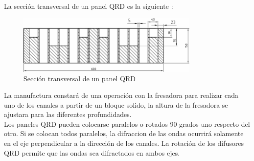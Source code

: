 La sección transversal de un panel QRD es la siguiente \cite{PilchDiffusers}:
\begin{figure}[!htb]
    \centering
    \includegraphics[width=0.8\textwidth]{imagenes/QRD-150-diffusers-cross-section.png}
    \caption{Sección transversal de un panel QRD}
    \label{fig:QRDCross}
\end{figure}
\FloatBarrier
La manufactura constará de una operación con la fresadora para realizar cada uno de los canales a partir de un bloque solido, la altura de la fresadora se ajustara para las diferentes profundidades. \\
Los paneles QRD pueden colocarse paralelos o rotados 90 grados uno respecto del otro. Si se colocan todos paralelos, la difraccion de las ondas ocurrirá solamente en el eje perpendicular a la dirección de los canales. La rotación de los difusores QRD permite que las ondas sea difractados en ambos ejes.